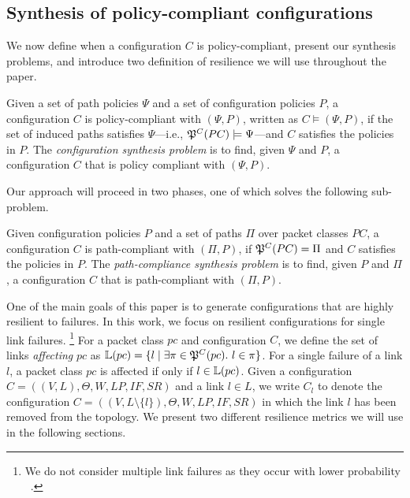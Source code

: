 \subsection{Synthesis of policy-compliant configurations}
We now define when a configuration $C$ is policy-compliant, present our synthesis problems, and introduce two definition of resilience we will use throughout the paper.
\begin{definition} \label{def:policycompliance}
	Given a set of path policies $\Psi$ and a set of configuration policies $P$,
	a configuration $C$ is policy-compliant with $(\Psi,P)$,  
	written as $C \models (\Psi,P)$, if the set of
	induced paths satisfies $\Psi$---i.e., $\mathfrak{P}^C(PC) \models \Psi$---and $C$ satisfies the policies in $P$.
	The \emph{configuration synthesis problem} is to find, given $\Psi$ and $P$,
a configuration $C$ that is policy compliant with $(\Psi,P)$.
\end{definition}

Our approach will proceed in two phases,
one of which solves the following sub-problem.  
\begin{definition} \label{def:pathcompliance}
Given configuration policies $P$
and a set of paths $\Pi$ over packet classes $PC$,
	a configuration $C$ is path-compliant with 
	$(\Pi,P)$,
	if $\mathfrak{P}^C(PC)=\Pi$ and $C$ satisfies the policies in $P$.
	The \emph{path-compliance synthesis problem} is to find, given $P$ and $\Pi$,
a configuration $C$ that is path-compliant with $(\Pi,P)$.
\end{definition}

One of the main goals of this paper is to 
generate configurations that are highly resilient to failures. In this
work, we focus on resilient configurations for single link failures.
\footnote{ 
We do not consider multiple link failures as they occur with lower probability
~\cite{datacenterfailures}.}
For a packet class $pc$ and configuration $C$, we define 
the set of links \emph{affecting} $pc$ as 
$\mathbb{L}(pc) = \{l \mid \exists \pi \in \mathfrak{P}^C(pc).~l \in \pi  \}$.
For a single failure of a link $l$, a packet class $pc$ is affected 
if only if $l \in \mathbb{L}(pc)$. 
Given a configuration
$C=((V,L), \Theta,W,LP,IF,SR)$ and a link $l\in L$,
we write $C_l$ 
to denote the configuration
$C=((V,L\setminus\{l\}), \Theta,W,LP,IF,SR)$
in which the link $l$ has been removed from the topology.
We present two different resilience metrics 
we will use in the following sections. 

